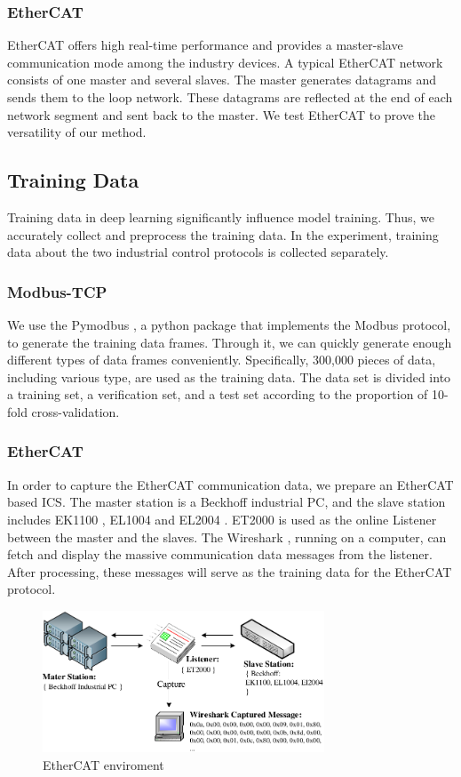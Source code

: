 \subsubsection{EtherCAT}
EtherCAT offers high real-time performance and provides a master-slave communication mode among the industry devices. A typical EtherCAT network consists of one master and several slaves. The master generates datagrams and sends them to the loop network. These datagrams are reflected at the end of each network segment and sent back to the master. We test EtherCAT to prove the versatility of our method.

\subsection{Training Data}
Training data in deep learning significantly influence model training. Thus, we accurately collect and preprocess the training data. In the experiment, training data about the two industrial control protocols is collected separately.

\subsubsection{Modbus-TCP}
We use the Pymodbus \cite{Pymodbus}, a python package that implements the Modbus protocol, to generate the training data frames. Through it, we can quickly generate enough different types of data frames conveniently. Specifically, 300,000 pieces of data, including various type, are used as the training data. The data set is divided into a training set, a verification set, and a test set according to the proportion of 10-fold cross-validation.

\subsubsection{EtherCAT}
In order to capture the EtherCAT communication data, we prepare an EtherCAT based ICS. The master station is a Beckhoff \cite{Beckhoff} industrial PC, and the slave station includes EK1100 \cite{EK1100},  EL1004 \cite{EL1004} and EL2004 \cite{EL2004}. ET2000 \cite{ET2000} is used as the online Listener between the master and the slaves. The Wireshark \cite{Wireshark}, running on a computer, can fetch and display the massive communication data messages from the listener. After processing, these messages will serve as the training data for the EtherCAT protocol.
\begin{figure}[htbp]
\centering
\includegraphics[width=3.3in]{FIGURE_LV/FIGURE_ETHERCAT.pdf}
\caption{EtherCAT enviroment}
\label{FIGURE_DGD}
\end{figure}

